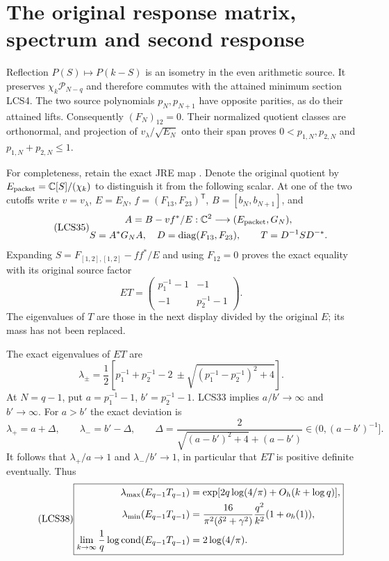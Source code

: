 \documentclass[11pt,a4paper]{article}
\providecommand{\PP}{\mathcal P}
\begin{document}
\section{The original response matrix, spectrum and second response}

Reflection $P(S)\mapsto P(k-S)$ is an isometry in the even
arithmetic source. It preserves $\chi_k\PP_{N-q}$ and therefore
commutes with the attained minimum section LCS4. The two source
polynomials $p_N,p_{N+1}$ have opposite parities, as do their
attained lifts. Consequently $(F_N)_{12}=0$. Their normalized
quotient classes are orthonormal, and projection of
$v_\lambda/\sqrt{E_N}$ onto their span proves
$0<p_{1,N},p_{2,N}$ and $p_{1,N}+p_{2,N}\le1$.

For completeness, retain the exact JRE map \cite{a04lcs:jre}. Denote
the original quotient by $E_{\rm packet}=\mathbb C[S]/(\chi_k)$ to
distinguish it from the following scalar. At one
of the two cutoffs write $v=v_\lambda$, $E=E_N$,
$f=(F_{13},F_{23})^{\mathsf T}$, $B=[b_N,b_{N+1}]$, and
\begin{equation}\tag{LCS35}
\begin{gathered}
 A=B-vf^*/E:\mathbb C^2\longrightarrow(E_{\rm packet},G_N),\\
 S=A^*G_NA,\quad D=\operatorname{diag}(F_{13},F_{23}),\qquad
 T=D^{-1}SD^{-*}.
\end{gathered}
\end{equation}
Expanding $S=F_{[1,2],[1,2]}-ff^*/E$ and using $F_{12}=0$
proves the exact equality with its original source factor
\begin{equation}\tag{LCS36}
 \boxed{ET=\begin{pmatrix}p_1^{-1}-1&-1\\-1&p_2^{-1}-1\end{pmatrix}.}
\end{equation}
The eigenvalues of $T$ are those in the next display divided by
the original $E$; its mass has not been replaced.

The exact eigenvalues of $ET$ are
\begin{equation}\tag{LCS37}
 \lambda_\pm=\frac12\left[p_1^{-1}+p_2^{-1}-2
       \ \pm\sqrt{(p_1^{-1}-p_2^{-1})^2+4}\right].
\end{equation}
At $N=q-1$, put $a=p_1^{-1}-1$, $b'=p_2^{-1}-1$.
LCS33 implies $a/b'\to\infty$ and $b'\to\infty$.
For $a>b'$ the exact deviation is
\[
 \lambda_+=a+\Delta,\qquad\lambda_-=b'-\Delta,\qquad
 \Delta=\frac{2}{\sqrt{(a-b')^2+4}+(a-b')}
       \in(0,(a-b')^{-1}].
\]
It follows that $\lambda_+/a\to1$ and $\lambda_-/b'\to1$,
in particular that $ET$ is positive definite eventually. Thus
\begin{equation}\tag{LCS38}
\boxed{\begin{aligned}
 \lambda_{\max}(E_{q-1}T_{q-1})
    &=\exp[2q\log(4/\pi)+O_h(k+\log q)],\\
 \lambda_{\min}(E_{q-1}T_{q-1})
    &=\frac{16}{\pi^2(\delta^2+\gamma^2)}
                    \frac{q^2}{k^2}(1+o_h(1)),\\
 \lim_{k\to\infty}\frac1q\log\operatorname{cond}(E_{q-1}T_{q-1})
    &=2\log(4/\pi).
\end{aligned}}
\end{equation}
\end{document}
